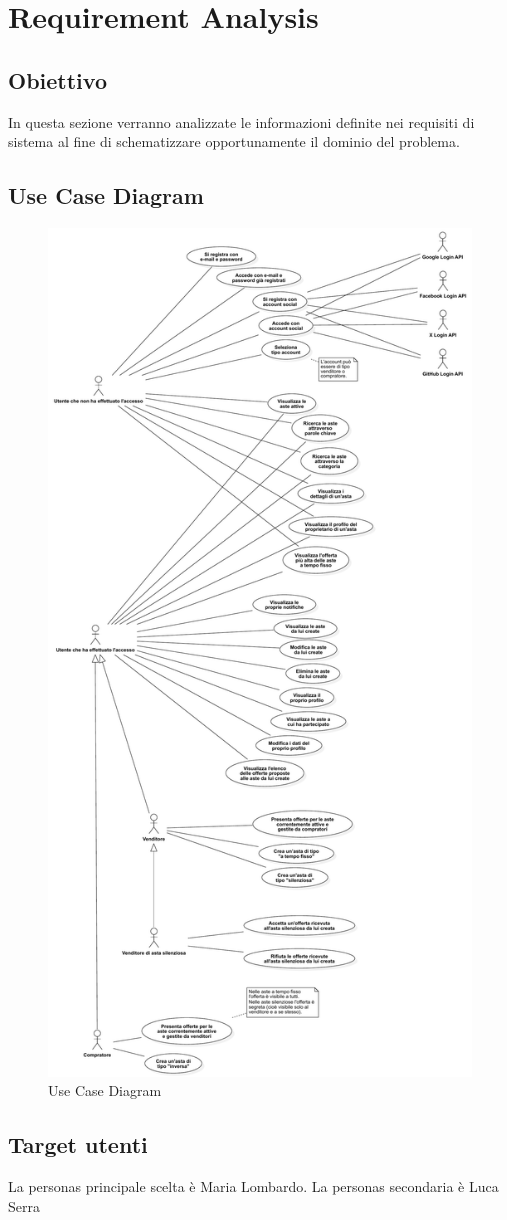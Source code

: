 
\chapter{Requirement Analysis}
    \section{Obiettivo}
        In questa sezione verranno analizzate le informazioni definite nei requisiti di sistema al fine di schematizzare opportunamente il dominio del problema.

    \section{Use Case Diagram}
        \begin{figure}[htbp!]
            \centering
                \vspace{2\baselineskip}
                \includegraphics[width=0.41\linewidth]{Immagini/Diagrammi/UseCaseDiagram.pdf}
            \caption{Use Case Diagram}
            \label{fig:Use Case Diagram}
        \end{figure}

    \newpage
    
    \section{Target utenti}
        La personas principale scelta è Maria Lombardo. La personas secondaria è Luca Serra
        
